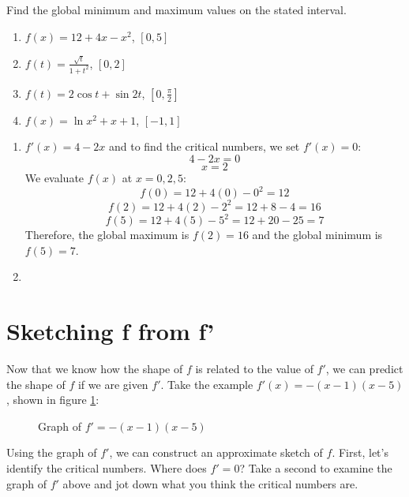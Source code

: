 \begin{Exercise}[label=gloext2]
Find the global minimum and maximum values on the stated interval.
\begin{enumerate}
	\item $f(x) = 12+4x-x^2$, $[0,5]$
	\item $f(t) = \frac{\sqrt{t}}{1+t^2}$, $[0, 2]$
	\item $f(t) = 2\cos{t} + \sin{2t}$, $[0, \frac{\pi}{2}]$
	\item $f(x) = \ln{x^2+x+1}$, $[-1, 1]$
\end{enumerate}
\end{Exercise}

\begin{Answer}[ref=gloext2]
\begin{enumerate}
	\item $f'(x) = 4-2x$ and to find the critical numbers, we set $f'(x)=0$:
$$4-2x=0$$
$$x=2$$
We evaluate $f(x)$ at $x=0, 2, 5$:
$$f(0) = 12+4(0)-0^2=12$$
$$f(2) = 12+4(2)-2^2=12+8-4=16$$
$$f(5) = 12+4(5)-5^2=12+20-25=7$$
Therefore, the global maximum is $f(2) = 16$ and the global minimum is $f(5) = 7$.
\item %
\end{enumerate}
\end{Answer}

\section{Sketching f from f'}
Now that we know how the shape of $f$ is related to the value of $f'$, we can predict the shape of $f$ if we are given $f'$. Take the example $f'(x) = -(x-1)(x-5)$, shown in figure \ref{fig:sketchf1}:

\begin{figure}[htbp]
	\centering
	\caption{Graph of $f'=-(x-1)(x-5)$}
	\label{fig:sketchf1}
\end{figure}

Using the graph of $f'$, we can construct an approximate sketch of $f$. First, let's identify the critical numbers. Where does $f'=0$? Take a second to examine the graph of $f'$ above and jot down what you think the critical numbers are.

